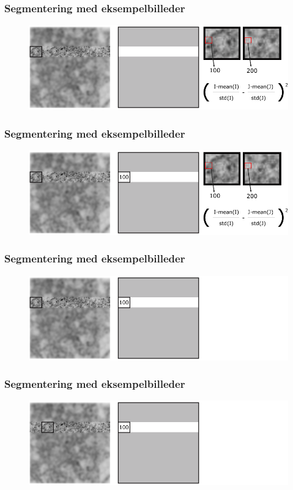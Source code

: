 \documentclass[12pt,t]{beamer}
\begin{document}
\begin{frame}
\frametitle{Segmentering med eksempelbilleder}
\begin{figure}[H]
\includegraphics[scale=0.35]{img/afstand/8.png}
\end{figure}
\end{frame}

\begin{frame}
\frametitle{Segmentering med eksempelbilleder}
\begin{figure}[H]
\includegraphics[scale=0.35]{img/afstand/9.png}
\end{figure}
\end{frame}

\begin{frame}
\frametitle{Segmentering med eksempelbilleder}
\begin{figure}[H]
\includegraphics[scale=0.35]{img/afstand/10.png}
\end{figure}
\end{frame}

\begin{frame}
\frametitle{Segmentering med eksempelbilleder}
\begin{figure}[H]
\includegraphics[scale=0.35]{img/afstand/11.png}
\end{figure}
\end{frame}
\end{document}
